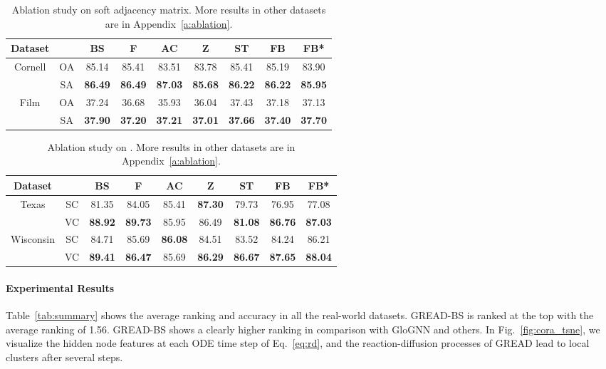 \documentclass{article}
\theoremstyle{plain}
\theoremstyle{definition}
\theoremstyle{remark}
\begin{document}
\begin{table}[t]
     \small
     \centering
     \setlength{\tabcolsep}{2pt}
     \caption{Ablation study on soft adjacency matrix. More results in other datasets are in Appendix~\ref{a:ablation}.}
     \begin{tabular}{cc cccc ccc}\toprule
        Dataset &  &  BS & F & AC & Z & ST & FB & FB*\\ \midrule
        \multirow{2}{*}{Cornell}
        & OA   &  85.14 & 85.41 & 83.51 & 83.78 & 85.41 & 85.19 & 83.90 \\
        & SA   &  \textbf{86.49} & \textbf{86.49} & \textbf{87.03} & \textbf{85.68} & \textbf{86.22} & \textbf{86.22} & \textbf{85.95}\\
        \midrule
        \multirow{2}{*}{Film}
        & OA   &  37.24 & 36.68 & 35.93 & 36.04 & 37.43 & 37.18 & 37.13\\
        & SA   &  \textbf{37.90} & \textbf{37.20 }& \textbf{37.21} & \textbf{37.01} & \textbf{37.66} & \textbf{37.40} & \textbf{37.70}\\
        \bottomrule
     \end{tabular}
     \label{tab:soft}
 \end{table}

 \begin{table}[t]
     \small
     \centering
     \setlength{\tabcolsep}{2pt}
     \caption{Ablation study on . More results in other datasets are in Appendix~\ref{a:ablation}.}
     \begin{tabular}{cc cccc ccc}\toprule
        Dataset &  &  BS & F & AC & Z & ST & FB & FB*\\ \midrule
        \multirow{2}{*}{Texas}
        & SC    &  81.35 & 84.05 & 85.41 & \textbf{87.30} & 79.73 & 76.95 & 77.08\\
        & VC    &  \textbf{88.92} & \textbf{89.73} & 85.95 & 86.49 & \textbf{81.08} & \textbf{86.76} & \textbf{87.03}\\
        \midrule
        \multirow{2}{*}{Wisconsin}
        & SC    &  84.71 & 85.69 & \textbf{86.08} & 84.51 & 83.52 & 84.24 & 86.21\\
        & VC    &  \textbf{89.41} & \textbf{86.47} & 85.69 & \textbf{86.29} & \textbf{86.67} & \textbf{87.65} & \textbf{88.04}\\
        \bottomrule
     \end{tabular}
     \label{tab:beta}
 \end{table}
 
\paragraph{Experimental Results} Table~\ref{tab:summary} shows the average ranking and accuracy in all the real-world datasets. GREAD-BS is ranked at the top with the average ranking of 1.56. GREAD-BS shows a clearly higher ranking in comparison with GloGNN and others. In Fig.~\ref{fig:cora_tsne}, we visualize the hidden node features at each ODE time step of Eq.~\eqref{eq:rd}, and the reaction-diffusion processes of GREAD lead to local clusters after several steps.
\end{document}
